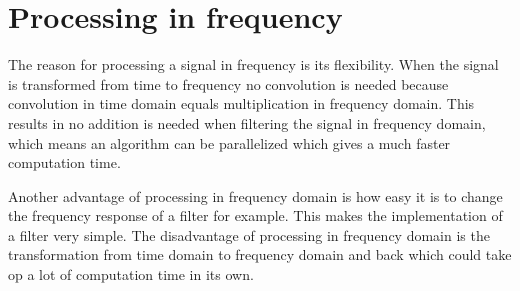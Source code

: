 \section{Processing in frequency}
The reason for processing a signal in frequency is its flexibility. When the signal is transformed from time to frequency no convolution is needed because convolution in time domain equals multiplication in frequency domain. This results in no addition is needed when filtering the signal in frequency domain, which means an algorithm can be parallelized which gives a much faster computation time. 

Another advantage of processing in frequency domain is how easy it is to change the frequency response of a filter for example. This makes the implementation of a filter very simple. The disadvantage of processing in frequency domain is the transformation from time domain to frequency domain and back which could take op a lot of computation time in its own. 

